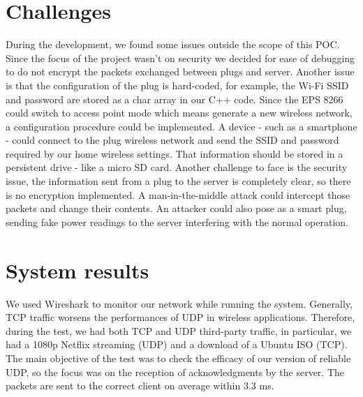 \documentclass[conference]{IEEEtran}
\begin{document}
\section{Challenges}
During the development, we found some issues outside the scope of this POC. Since the focus of the project wasn't on security we decided for ease of debugging to do not encrypt the packets exchanged between plugs and server. Another issue is that the configuration of the plug is hard-coded, for example, the Wi-Fi SSID and password are stored as a char array in our C++ code. Since the EPS 8266 could switch to access point mode which means generate a new wireless network, a configuration procedure could be implemented. A device - such as a smartphone - could connect to the plug wireless network and send the SSID and password required by our home wireless settings. That information should be stored in a persistent drive - like a micro SD card.
Another challenge to face is the security issue, the information sent from a plug to the server is completely clear, so there is no encryption implemented. A man-in-the-middle attack could intercept those packets and change their contents. An attacker could also pose as a smart plug, sending fake power readings to the server interfering with the normal operation.

\section{System results}
We used Wireshark to monitor our network while running the system. Generally, TCP traffic worsens the performances of UDP in wireless applications. Therefore, during the test, we had both TCP and UDP third-party traffic, in particular, we had a 1080p Netflix streaming (UDP) and a download of a Ubuntu ISO (TCP). The main objective of the test was to check the efficacy of our version of reliable UDP, so the focus was on the reception of acknowledgments by the server. The packets are sent to the correct client on average within 3.3 ms.
\end{document}
